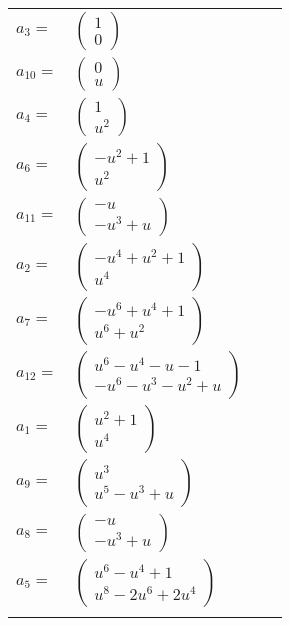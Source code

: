 \documentclass[1p]{elsarticle_modified}
\theoremstyle{definition}
\begin{document}
\begin{tabular}{m{7pt} m{180pt} m{7pt} m{180pt} }
\flushright $a_{3}=$&$\begin{pmatrix}1\\0\end{pmatrix}$ \\
\flushright $a_{10}=$&$\begin{pmatrix}0\\u\end{pmatrix}$ \\
\flushright $a_{4}=$&$\begin{pmatrix}1\\u^2\end{pmatrix}$ \\
\flushright $a_{6}=$&$\begin{pmatrix}- u^2+1\\u^2\end{pmatrix}$ \\
\flushright $a_{11}=$&$\begin{pmatrix}- u\\- u^3+u\end{pmatrix}$ \\
\flushright $a_{2}=$&$\begin{pmatrix}- u^4+u^2+1\\u^4\end{pmatrix}$ \\
\flushright $a_{7}=$&$\begin{pmatrix}- u^6+u^4+1\\u^6+u^2\end{pmatrix}$ \\
\flushright $a_{12}=$&$\begin{pmatrix}u^6- u^4- u-1\\- u^6- u^3- u^2+u\end{pmatrix}$ \\
\flushright $a_{1}=$&$\begin{pmatrix}u^2+1\\u^4\end{pmatrix}$ \\
\flushright $a_{9}=$&$\begin{pmatrix}u^3\\u^5- u^3+u\end{pmatrix}$ \\
\flushright $a_{8}=$&$\begin{pmatrix}- u\\- u^3+u\end{pmatrix}$ \\
\flushright $a_{5}=$&$\begin{pmatrix}u^6- u^4+1\\u^8-2 u^6+2 u^4\end{pmatrix}$\\&\end{tabular}
\end{document}
